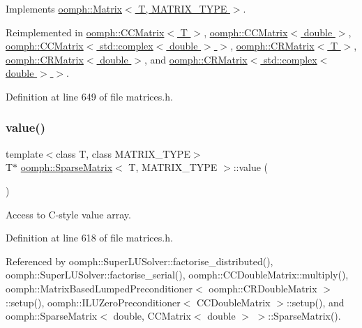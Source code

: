 Implements \hyperlink{classoomph_1_1Matrix_a7a5b44e7688ce2c2f7552da104e615c8}{oomph\+::\+Matrix$<$ T, M\+A\+T\+R\+I\+X\+\_\+\+T\+Y\+P\+E $>$}.



Reimplemented in \hyperlink{classoomph_1_1CCMatrix_a1f6e451f0688c392e45bc03bf20fdda7}{oomph\+::\+C\+C\+Matrix$<$ T $>$}, \hyperlink{classoomph_1_1CCMatrix_a1f6e451f0688c392e45bc03bf20fdda7}{oomph\+::\+C\+C\+Matrix$<$ double $>$}, \hyperlink{classoomph_1_1CCMatrix_a1f6e451f0688c392e45bc03bf20fdda7}{oomph\+::\+C\+C\+Matrix$<$ std\+::complex$<$ double $>$ $>$}, \hyperlink{classoomph_1_1CRMatrix_af34167172020d60e5fa382e4bd5d6466}{oomph\+::\+C\+R\+Matrix$<$ T $>$}, \hyperlink{classoomph_1_1CRMatrix_af34167172020d60e5fa382e4bd5d6466}{oomph\+::\+C\+R\+Matrix$<$ double $>$}, and \hyperlink{classoomph_1_1CRMatrix_af34167172020d60e5fa382e4bd5d6466}{oomph\+::\+C\+R\+Matrix$<$ std\+::complex$<$ double $>$ $>$}.



Definition at line 649 of file matrices.\+h.

\mbox{\label{classoomph_1_1SparseMatrix_a3e382ff145082821a6b0b3e63b6aed5d}} 
\subsubsection{\texorpdfstring{value()}{value()}\hspace{0.1cm}{\footnotesize\ttfamily [1/2]}}
{\footnotesize\ttfamily template$<$class T, class M\+A\+T\+R\+I\+X\+\_\+\+T\+Y\+PE$>$ \\
T$\ast$ \hyperlink{classoomph_1_1SparseMatrix}{oomph\+::\+Sparse\+Matrix}$<$ T, M\+A\+T\+R\+I\+X\+\_\+\+T\+Y\+PE $>$\+::value (\begin{DoxyParamCaption}{ }\end{DoxyParamCaption})\hspace{0.3cm}{\ttfamily [inline]}}



Access to C-\/style value array. 



Definition at line 618 of file matrices.\+h.



Referenced by oomph\+::\+Super\+L\+U\+Solver\+::factorise\+\_\+distributed(), oomph\+::\+Super\+L\+U\+Solver\+::factorise\+\_\+serial(), oomph\+::\+C\+C\+Double\+Matrix\+::multiply(), oomph\+::\+Matrix\+Based\+Lumped\+Preconditioner$<$ oomph\+::\+C\+R\+Double\+Matrix $>$\+::setup(), oomph\+::\+I\+L\+U\+Zero\+Preconditioner$<$ C\+C\+Double\+Matrix $>$\+::setup(), and oomph\+::\+Sparse\+Matrix$<$ double, C\+C\+Matrix$<$ double $>$ $>$\+::\+Sparse\+Matrix().

